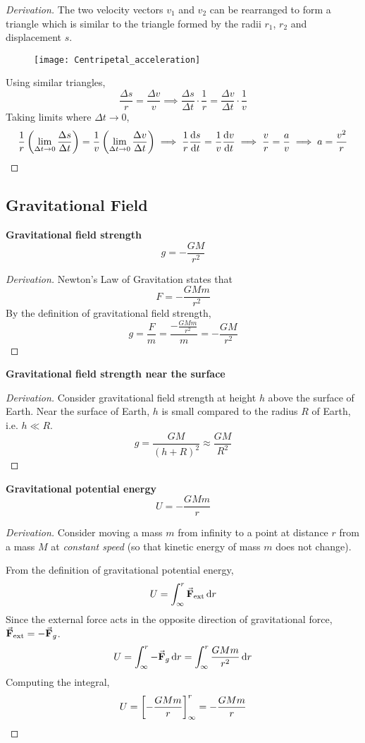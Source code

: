 \begin{proof}[Derivation]
The two velocity vectors $v_1$ and $v_2$ can be rearranged to form a triangle which is similar to the triangle formed by the radii $r_1$, $r_2$ and displacement $s$.
\begin{figure}[H]
	\centering
	\texttt{[image: Centripetal\_acceleration]}
\end{figure}
Using similar triangles,
\[ \frac{\Delta s}{r} = \frac{\Delta v}{v} \implies \frac{\Delta s}{\Delta t}\cdot\frac{1}{r} = \frac{\Delta v}{\Delta t}\cdot\frac{1}{v} \]
Taking limits where $\Delta t \to 0$,
\[ \frac{1}{r}\left(\lim_{\Delta t \to 0}\frac{\Delta s}{\Delta t}\right) = \frac{1}{v}\left(\lim_{\Delta t \to 0}\frac{\Delta v}{\Delta t}\right) \implies \frac{1}{r}\dv{s}{t}=\frac{1}{v}\dv{v}{t} \implies \frac{v}{r} = \frac{a}{v} \implies a = \frac{v^2}{r} \]
\end{proof}
\pagebreak

\subsection{Gravitational Field}
\textbf{Gravitational field strength}
\[ g=-\frac{GM}{r^2} \]
\begin{proof}[Derivation]
Newton's Law of Gravitation states that 
\[ F=-\frac{GMm}{r^2} \]
By the definition of gravitational field strength,
\[ g=\frac{F}{m}=\frac{-\frac{GMm}{r^2}}{m}=-\frac{GM}{r^2} \]
\end{proof}

\textbf{Gravitational field strength near the surface}
\begin{proof}[Derivation]
Consider gravitational field strength at height $h$ above the surface of Earth. Near the surface of Earth, $h$ is small compared to the radius $R$ of Earth, i.e. $h \ll R$.
\[ g = \frac{GM}{(h+R)^2} \approx \frac{GM}{R^2} \]
\end{proof}

\textbf{Gravitational potential energy}
\[ U = -\frac{GMm}{r} \]

\begin{proof}[Derivation]
Consider moving a mass $m$ from infinity to a point at distance $r$ from a mass $M$ at \emph{constant speed} (so that kinetic energy of mass $m$ does not change).

From the definition of gravitational potential energy,
\[ U = \int_{\infty}^r \va{F}_{\mathrm{ext}} \dd{r} \]
Since the external force acts in the opposite direction of gravitational force, $\va{F}_{\mathrm{ext}}=-\va{F}_g$.
\[ U = \int_{\infty}^r -\va{F}_g \dd{r} = \int_{\infty}^r \frac{GMm}{r^2} \dd{r} \]
Computing the integral, 
\[ U = \left[-\frac{GMm}{r}\right]^r_{\infty} = -\frac{GMm}{r} \]
\end{proof}
\pagebreak

